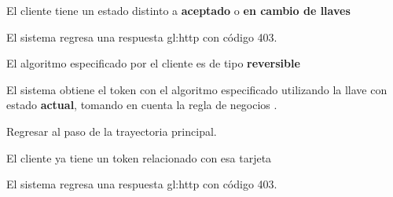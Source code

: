 {\begin{trayectoriaPrincipal}
  \end{trayectoriaPrincipal}


  \begin{trayectoriaAlternativa}
    {El cliente tiene un estado distinto a \textbf{aceptado} o
      \textbf{en cambio de llaves}}

      \item El sistema regresa una respuesta \gls{gl:http} con código 403.

  \end{trayectoriaAlternativa}


  \begin{trayectoriaAlternativa}
    {El algoritmo especificado por el cliente es de tipo \textbf{reversible}}

    \item El sistema obtiene el token con el algoritmo especificado utilizando
      la llave con estado \textbf{actual}, tomando en cuenta la regla de
      negocios .

    \item Regresar al paso  de la trayectoria
      principal.

  \end{trayectoriaAlternativa}

  \begin{trayectoriaAlternativa}
    {El cliente ya tiene un token relacionado con esa tarjeta}

    \item El sistema regresa una respuesta \gls{gl:http} con código 403.

  \end{trayectoriaAlternativa}

}
